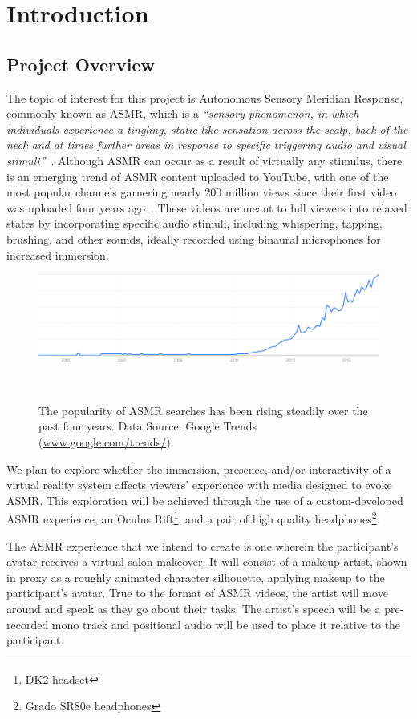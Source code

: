 \documentclass{sigchi}
\newcommand{\inlinequote}[1]{\textit{``#1''}}
\begin{document}
\section{Introduction}

\subsection{Project Overview}

The topic of interest for this project is Autonomous Sensory Meridian Response, commonly known as ASMR, which is a \inlinequote{sensory phenomenon, in which individuals experience a tingling, static-like sensation across the scalp, back of the neck and at times further areas in response to specific triggering audio and visual stimuli}~\cite{barratt2015autonomous}. Although ASMR can occur as a result of virtually any stimulus, there is an emerging trend of ASMR content uploaded to YouTube, with one of the most popular channels garnering nearly 200 million views since their first video was uploaded four years ago~\cite{anon.gentlewhispering}. These videos are meant to lull viewers into relaxed states by incorporating specific audio stimuli, including whispering, tapping, brushing, and other sounds, ideally recorded using binaural microphones for increased immersion.

\begin{figure}[htb]
\centering
  \includegraphics[width=0.9\columnwidth]{figures/google-trends}
  \caption{The popularity of ASMR searches has been rising steadily over the past four years. Data Source: Google Trends (\url{www.google.com/trends/}).}~\label{fig:google-trends}
\end{figure}

We plan to explore whether the immersion, presence, and/or interactivity of a virtual reality system affects viewers' experience with media designed to evoke ASMR. This exploration will be achieved through the use of a custom-developed ASMR experience, an Oculus Rift\footnote{DK2 headset}, and a pair of high quality headphones\footnote{Grado SR80e headphones}.

The ASMR experience that we intend to create is one wherein the participant's avatar receives a virtual salon makeover. It will consist of a makeup artist, shown in proxy as a roughly animated character silhouette, applying makeup to the participant's avatar. True to the format of ASMR videos, the artist will move around and speak as they go about their tasks. The artist's speech will be a pre-recorded mono track and positional audio will be used to place it relative to the participant.
\end{document}
